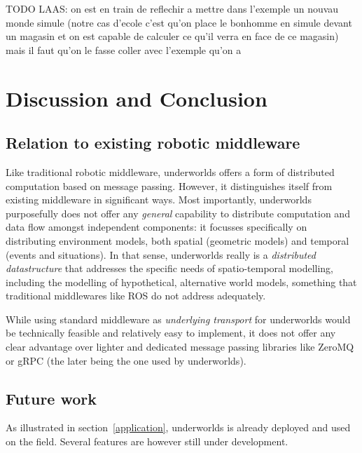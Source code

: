 \documentclass[letterpaper, 10pt, conference]{ieeeconf}
\newcommand{\uwds}{{\sc underworlds}\xspace}
\begin{document}
{TODO LAAS: on est en train de reflechir a mettre dans l'exemple un nouvau monde simule (notre cas d'ecole c'est qu'on place le bonhomme en simule devant un magasin et on est capable de calculer ce qu'il verra en face de ce magasin) mais il faut qu'on le fasse coller avec l'exemple qu'on a 

\section{Discussion and Conclusion}

\subsection{Relation to existing robotic middleware}

Like traditional robotic middleware, \uwds offers a form of distributed
computation based on message passing. However, it distinguishes itself from
existing middleware in significant ways. Most importantly, \uwds purposefully
does not offer any \emph{general} capability to distribute computation and data
flow amongst independent components: it focusses specifically on distributing
environment models, both spatial (geometric models) and temporal (events and
situations). In that sense, \uwds really is a \emph{distributed datastructure}
that addresses the specific needs of spatio-temporal modelling,
including the modelling of hypothetical, alternative world models, something
that traditional middlewares like ROS do not address adequately.

While using standard middleware as \emph{underlying transport} for \uwds would be
technically feasible and relatively easy to implement, it does not offer any
clear advantage over lighter and dedicated message passing libraries like ZeroMQ
or gRPC (the later being the one used by \uwds).

\subsection{Future work}
\label{futurework}

As illustrated in section~\ref{application}, \uwds is already deployed and used
on the field. Several features are however still under development.

}
\end{document}
